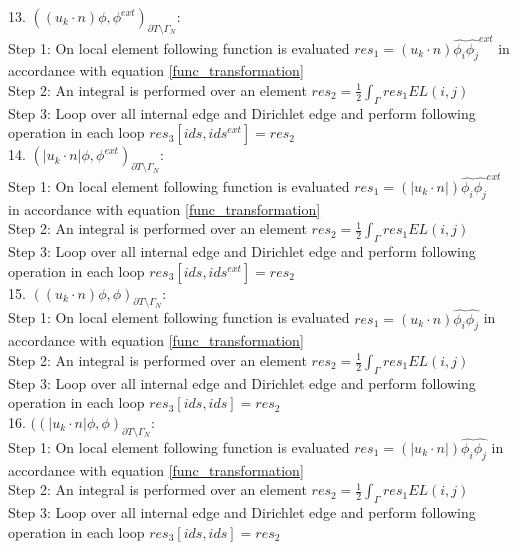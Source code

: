 \documentclass[a4paper]{book}
\begin{document}
13. $((u_k \cdot n)\phi,\phi^{ext})_{\partial T \setminus \Gamma_N}$:\\
Step 1: On local element following function is evaluated $res_1 = (u_k \cdot n) \hat{\phi_i} \hat{\phi_j}^{ext} $ in accordance with equation \ref{func_transformation}\\
Step 2: An integral is performed over an element $res_2 = \frac{1}{2} \int_{\Gamma} res_1 EL(i,j) $\\
Step 3: Loop over all internal edge and Dirichlet edge and perform following operation in each loop $res_3[ids,ids^{ext}] = res_2$\\

14. $(|u_k \cdot n| \phi,\phi^{ext})_{\partial T \setminus \Gamma_N}$:\\
Step 1: On local element following function is evaluated $res_1 = (|u_k \cdot n|) \hat{\phi_i} \hat{\phi_j}^{ext} $ in accordance with equation \ref{func_transformation}\\
Step 2: An integral is performed over an element $res_2 = \frac{1}{2} \int_{\Gamma} res_1 EL(i,j) $\\
Step 3: Loop over all internal edge and Dirichlet edge and perform following operation in each loop $res_3[ids,ids^{ext}] = res_2$\\

15. $((u_k \cdot n)\phi,\phi)_{\partial T \setminus \Gamma_N}$:\\
Step 1: On local element following function is evaluated $res_1 = (u_k \cdot n) \hat{\phi_i} \hat{\phi_j} $ in accordance with equation \ref{func_transformation}\\
Step 2: An integral is performed over an element $res_2 = \frac{1}{2} \int_{\Gamma} res_1 EL(i,j) $\\
Step 3: Loop over all internal edge and Dirichlet edge and perform following operation in each loop $res_3[ids,ids] = res_2$\\

16. $((|u_k \cdot n| \phi,\phi)_{\partial T \setminus \Gamma_N}$:\\
Step 1: On local element following function is evaluated $res_1 = (|u_k \cdot n|) \hat{\phi_i} \hat{\phi_j} $ in accordance with equation \ref{func_transformation}\\
Step 2: An integral is performed over an element $res_2 = \frac{1}{2} \int_{\Gamma} res_1 EL(i,j) $\\
Step 3: Loop over all internal edge and Dirichlet edge and perform following operation in each loop $res_3[ids,ids] = res_2$\\
\end{document}

